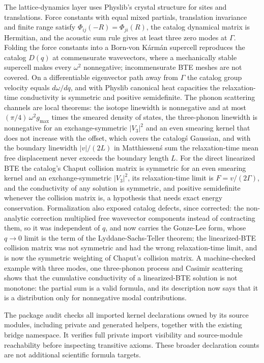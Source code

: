 \documentclass[11pt,a4paper]{article}
\begin{document}
The lattice-dynamics layer uses Physlib's crystal structure for sites and translations. Force constants with equal mixed partials, translation invariance and finite range satisfy $\Phi_{ij}(-R) = \Phi_{ji}(R)$, the catalog dynamical matrix is Hermitian, and the acoustic sum rule gives at least three zero modes at $\Gamma$. Folding the force constants into a Born-von K\'arm\'an supercell reproduces the catalog $D(q)$ at commensurate wavevectors, where a mechanically stable supercell makes every $\omega^2$ nonnegative; incommensurate BTE meshes are not covered. On a differentiable eigenvector path away from $\Gamma$ the catalog group velocity equals $d\omega/dq$, and with Physlib canonical heat capacities the relaxation-time conductivity is symmetric and positive semidefinite. The phonon scattering channels are local theorems: the isotope linewidth is nonnegative and at most $(\pi/4)\,\omega^2 g_{\max}$ times the smeared density of states, the three-phonon linewidth is nonnegative for an exchange-symmetric $|V_3|^2$ and an even smearing kernel that does not increase with the offset, which covers the catalog\'s Gaussian, and with the boundary linewidth $|v|/(2L)$ in Matthiessen\'s sum the relaxation-time mean free displacement never exceeds the boundary length $L$. For the direct linearized BTE the catalog's Chaput collision matrix is symmetric for an even smearing kernel and an exchange-symmetric $|V_3|^2$, its relaxation-time limit is $F = v/(2\Gamma)$, and the conductivity of any solution is symmetric, and positive semidefinite whenever the collision matrix is, a hypothesis that needs exact energy conservation. Formalization also exposed catalog defects, since corrected: the non-analytic correction multiplied free wavevector components instead of contracting them, so it was independent of $q$, and now carries the Gonze-Lee form, whose $q \to 0$ limit is the term of the Lyddane-Sachs-Teller theorem; the linearized-BTE collision matrix was not symmetric and had the wrong relaxation-time limit, and is now the symmetric weighting of Chaput's collision matrix. A machine-checked example with three modes, one three-phonon process and Casimir scattering shows that the cumulative conductivity of a linearized-BTE solution is not monotone: the partial sum is a valid formula, and its description now says that it is a distribution only for nonnegative modal contributions.

The package audit checks all imported kernel declarations owned by its source
modules, including private and generated helpers, together with the existing
bridge namespace. It verifies full private import visibility and source-module
reachability before inspecting transitive axioms. These broader declaration
counts are not additional scientific formula targets.
\end{document}
